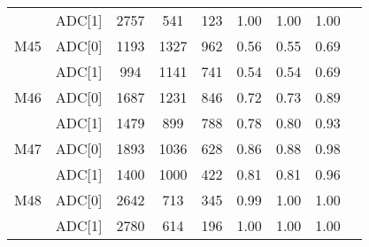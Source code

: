 \begin{longtable}{c c c c c c c c c}
      & ADC[1] & 2757 & 541 & 123 & 1.00 & 1.00 & 1.00\\
  M45 & ADC[0] & 1193 & 1327 & 962 & 0.56 & 0.55 & 0.69\\
      & ADC[1] & 994 & 1141 & 741 & 0.54 & 0.54 & 0.69\\
  M46 & ADC[0] & 1687 & 1231 & 846 & 0.72 & 0.73 & 0.89\\
      & ADC[1] & 1479 & 899 & 788 & 0.78 & 0.80 & 0.93\\
  M47 & ADC[0] & 1893 & 1036 & 628 & 0.86 & 0.88 & 0.98\\
      & ADC[1] & 1400 & 1000 & 422 & 0.81 & 0.81 & 0.96\\
  M48 & ADC[0] & 2642 & 713 & 345 & 0.99 & 1.00 & 1.00\\
      & ADC[1] & 2780 & 614 & 196 & 1.00 & 1.00 & 1.00\\
  \bottomrule
\end{longtable}

\normalsize


